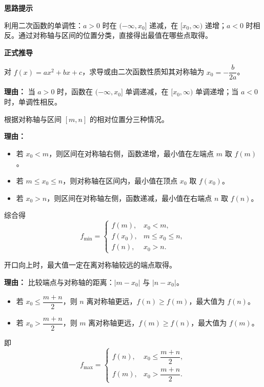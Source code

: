 \begin{proofbox}
	\textbf{\textcolor{CProof}{思路提示}}

	利用二次函数的单调性：$a>0$ 时在 $(-\infty,x_0]$ 递减，在 $[x_0,\infty)$ 递增；$a<0$ 时相反。通过对称轴与区间的位置分类，直接得出最值在哪些点取得。

	\medskip
	\textbf{\textcolor{CProof}{正式推导}}
	\begin{description}[style=nextline, leftmargin=2.8em, labelsep=0.5em, itemsep=0.55em]
		\item[\textbf{步骤一（单调性分析）：}] 对 $f(x)=ax^2+bx+c$，求导或由二次函数性质知其对称轴为 $x_0=-\dfrac{b}{2a}$。
			\par\textbf{理由：}
			当 $a>0$ 时，函数在 $(-\infty,x_0]$ 单调递减，在 $[x_0,\infty)$ 单调递增；当 $a<0$ 时，单调性相反。

		\item[\textbf{步骤二（最小值分类，$a>0$）：}] 根据对称轴与区间 $[m,n]$ 的相对位置分三种情况。
			\par\textbf{理由：}
			\begin{itemize}
			\item 若 $x_0<m$，则区间在对称轴右侧，函数递增，最小值在左端点 $m$ 取 $f(m)$。
			\item 若 $m\le x_0\le n$，则对称轴在区间内，最小值在顶点 $x_0$ 取 $f(x_0)$。
			\item 若 $x_0>n$，则区间在对称轴左侧，函数递减，最小值在右端点 $n$ 取 $f(n)$。
		\end{itemize}
			综合得
			\[
				f_{\min}=
				\begin{cases}
					f(m), & x_0<m,\\
					f(x_0), & m\le x_0\le n,\\
					f(n), & x_0>n.
			\end{cases}
			\]

		\item[\textbf{步骤三（最大值分类，$a>0$）：}] 开口向上时，最大值一定在离对称轴较远的端点取得。
			\par\textbf{理由：}
			比较端点与对称轴的距离：$|m-x_0|$ 与 $|n-x_0|$。
			\begin{itemize}
			\item 若 $x_0\le\dfrac{m+n}{2}$，则 $n$ 离对称轴更远，$f(n)\ge f(m)$，最大值为 $f(n)$。
			\item 若 $x_0>\dfrac{m+n}{2}$，则 $m$ 离对称轴更远，$f(m)\ge f(n)$，最大值为 $f(m)$。
		\end{itemize}
			即
			\[
				f_{\max}=
				\begin{cases}
					f(n), & x_0\le\dfrac{m+n}{2},\\[6pt]
					f(m), & x_0>\dfrac{m+n}{2}.
			\end{cases}
			\]


\end{description}
\end{proofbox}
